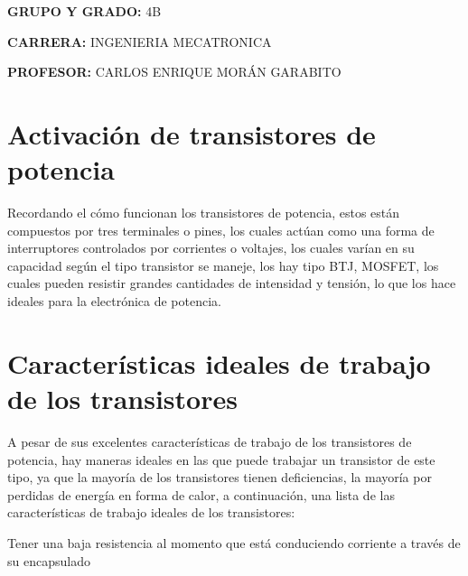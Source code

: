 \documentclass[12pt]{article}
\begin{document}
\begin{Center}
\textbf{GRUPO Y GRADO: }4B
\end{Center}\par

\begin{Center}
\textbf{CARRERA: }INGENIERIA MECATRONICA
\end{Center}\par

\begin{Center}
\textbf{PROFESOR: }CARLOS ENRIQUE MORÁN GARABITO
\end{Center}\par


\vspace{\baselineskip}

\vspace{\baselineskip}

\vspace{\baselineskip}

\vspace{\baselineskip}
\section{Activación de transistores de potencia}
\setlength{\parskip}{22.2pt}
Recordando el cómo funcionan los transistores de potencia, estos están compuestos por tres terminales o pines, los cuales actúan como una forma de interruptores controlados por corrientes o voltajes, los cuales varían en su capacidad según el tipo transistor se maneje, los hay tipo BTJ, MOSFET, los cuales pueden resistir grandes cantidades de intensidad y tensión, lo que los hace ideales para la electrónica de potencia.\par

\setlength{\parskip}{8.04pt}
\section{Características ideales de trabajo de los transistores}
\setlength{\parskip}{11.52pt}
A pesar de sus excelentes características de trabajo de los transistores de potencia, hay maneras ideales en las que puede trabajar un transistor de este tipo, ya que la mayoría de los transistores tienen deficiencias, la mayoría por perdidas de energía en forma de calor, a continuación, una lista de las características de trabajo ideales de los transistores:\par

\setlength{\parskip}{8.52pt}
\begin{adjustwidth}{0.25in}{0.0in}
Tener una baja resistencia al momento que está conduciendo corriente a través de su encapsulado\par

\end{adjustwidth}
\end{document}
